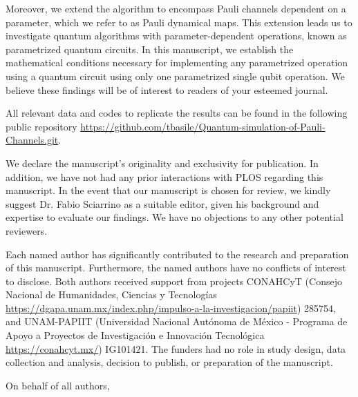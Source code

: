 \documentclass[12pt, addrfooterall, english]{if_letter_2013}
\begin{document}
\begin{letter}
Moreover, we extend the algorithm to encompass Pauli channels dependent on a
parameter, which we refer to as Pauli dynamical maps. This extension leads us
to investigate quantum algorithms with parameter-dependent operations, known as
parametrized quantum circuits.  In this manuscript, we establish the
mathematical conditions necessary for implementing any parametrized operation
using a quantum circuit using only one parametrized single qubit operation. We
believe these findings will be of interest to readers of your esteemed journal.

All relevant data and codes to replicate the results can be found in the following
public repository \href{https://github.com/tbasile/Quantum-simulation-of-Pauli-Channels.git}{https://github.com/tbasile/Quantum-simulation-of-Pauli-Channels.git}.

We declare the manuscript’s originality and exclusivity for publication. In
addition, we have not had any prior interactions with PLOS regarding this
manuscript. In the event that our manuscript is chosen for review, we kindly
suggest Dr. Fabio Sciarrino as a suitable editor, given his background and
expertise to evaluate our findings. We have no objections to any other
potential reviewers.

Each named author has significantly contributed to the research and preparation
of this manuscript. Furthermore, the named authors have no conflicts of
interest to disclose. Both authors received support from projects CONAHCyT 
(Consejo Nacional de Humanidades, Ciencias y Tecnologías
\href{https://dgapa.unam.mx/index.php/impulso-a-la-investigacion/papiit}{https://dgapa.unam.mx/index.php/impulso-a-la-investigacion/papiit}) 285754, 
and UNAM-PAPIIT  (Universidad Nacional Autónoma de México - Programa de Apoyo a 
Proyectos de Investigación e Innovación Tecnológica \href{https://conahcyt.mx/}{https://conahcyt.mx/}) IG101421.
The funders had no role in study design, data collection and analysis, 
decision to publish, or preparation of the manuscript.

\closing{On behalf of all authors,}

\end{letter}
\end{document}
